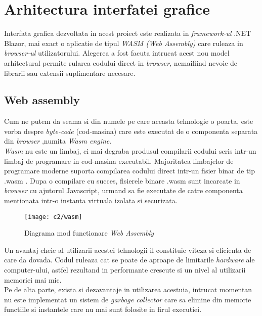 \section{Arhitectura interfatei grafice}
Interfata grafica dezvoltata in acest proiect este realizata in \textit{framework-ul} .NET Blazor, mai exact o aplicatie de tipul \textit{WASM (Web Assembly)} care ruleaza in \textit{browser-ul} utilizatorului. Alegerea a fost facuta intrucat acest nou model arhitectural permite rularea codului direct in \textit{browser}, nemaifiind nevoie de librarii sau extensii suplimentare necesare.\\

\newpage
\subsection*{Web assembly} 
Cum ne putem da seama si din numele pe care aceasta tehnologie o poarta, este vorba despre \textit{byte-code} (cod-masina) care este executat de o componenta separata din \textit{browser} ,numita \textit{Wasm engine}.\\
\textit{Wasm} nu este un limbaj, ci mai degraba produsul compilarii codului scris intr-un limbaj de programare in cod-masina executabil. Majoritatea limbajelor de programare moderne  suporta compilarea codului direct intr-un fisier  binar de tip .wasm . Dupa o compilare cu succes, fisierele binare .wasm sunt incarcate in \textit{browser} cu ajutorul Javascript, urmand sa fie executate de catre componenta mentionata intr-o instanta virtuala izolata si securizata.\\

\vspace{1cm}
\begin{figure}[h]
	\centering
	
	\texttt{[image: c2/wasm]}
	\caption{Diagrama mod functionare \textit{Web Assembly}}
\end{figure}

Un avantaj cheie al utilizarii acestei tehnologii il constituie viteza si eficienta de care da dovada. Codul ruleaza cat se poate de aproape de limitarile \textit{hardware} ale computer-ului, astfel rezultand in performante crescute si un nivel al utilizarii memoriei mai mic.\\
Pe de alta parte, exista si dezavantaje in utilizarea acestuia, intrucat momentan nu este implementat un sistem de \textit{garbage collector} care sa elimine din memorie functiile si instantele care nu mai sunt folosite in firul executiei.

